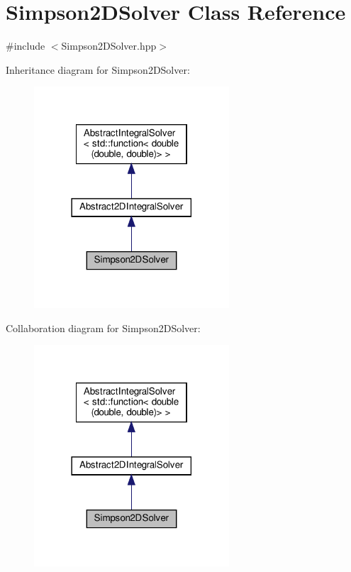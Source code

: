 \hypertarget{class_simpson2_d_solver}{}\section{Simpson2\+D\+Solver Class Reference}
\label{class_simpson2_d_solver}


{\ttfamily \#include $<$Simpson2\+D\+Solver.\+hpp$>$}



Inheritance diagram for Simpson2\+D\+Solver\+:\nopagebreak
\begin{figure}[H]
\begin{center}
\leavevmode
\includegraphics[width=206pt]{class_simpson2_d_solver__inherit__graph}
\end{center}
\end{figure}


Collaboration diagram for Simpson2\+D\+Solver\+:\nopagebreak
\begin{figure}[H]
\begin{center}
\leavevmode
\includegraphics[width=206pt]{class_simpson2_d_solver__coll__graph}
\end{center}
\end{figure}
